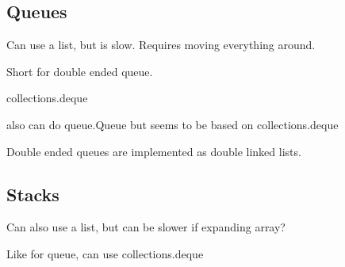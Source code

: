 \subsection{Queues}

Can use a list, but is slow. Requires moving everything around.

Short for double ended queue.

collections.deque

also can do queue.Queue but seems to be based on collections.deque

Double ended queues are implemented as double linked lists.

\subsection{Stacks}

Can also use a list, but can be slower if expanding array?

Like for queue, can use collections.deque

